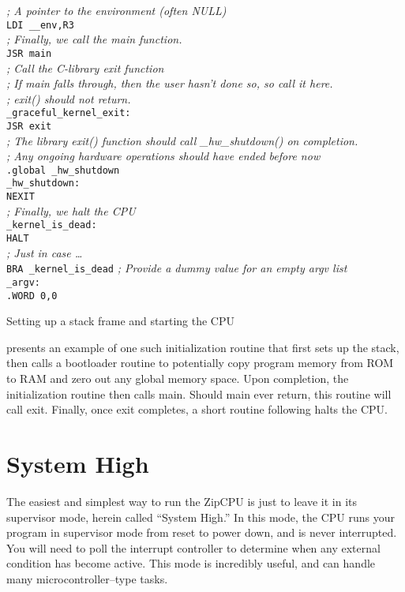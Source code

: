 \documentclass{gqtekspec}
\begin{document}
\begin{table}
\begin{center}
\begin{tabbing}
\>	{\em ; A pointer to the environment (often NULL)}\\
\>	{\tt LDI	\_\_env,R3} \\
%
%
\>	{\em ; Finally, we call the main function.}\\
\>	{\tt JSR	main}\\
%
%
{\em ; Call the C-library exit function}\\
{\em ; If main falls through, then the user hasn't done so, so call it here.}\\
{\em ; exit() should not return.}\\
{\tt \_graceful\_kernel\_exit:} \\
\>	{\tt JSR	exit}\\
%
{\em ; The library exit() function should call \_hw\_shutdown() on completion.}\\
{\em ; Any ongoing hardware operations should have ended before now}\\
\>	{\tt .global \_hw\_shutdown} \\
{\tt \_hw\_shutdown:} \\
\>	{\tt NEXIT}\\
%
%
{\em ; Finally, we halt the CPU }\\
{\tt \_kernel\_is\_dead:}\\
\>	{\tt HALT}\\
\>	{\em ; Just in case \ldots}\\
\> {\tt BRA \_kernel\_is\_dead}
{\em ; Provide a dummy value for an empty argv list}\\
{\tt \_argv:} \\
\> {\tt .WORD	0,0}
\end{tabbing}
\caption{Setting up a stack frame and starting the CPU}\label{tbl:op-init}
\end{center}\end{table}
presents an example of one such initialization routine
that first sets up the stack, then calls a bootloader routine to potentially
copy program memory from ROM to RAM and zero out any global memory space.
Upon completion, the initialization routine then calls main.  Should
main ever return, this routine will call exit.  Finally, once exit completes,
a short routine following halts the CPU.

\section{System High}
The easiest and simplest way to run the ZipCPU is just to leave it in its
supervisor mode, herein called ``System High.'' In this mode, the CPU runs
your program in supervisor mode from reset to power down, and is never
interrupted.  You will need to poll the interrupt controller to determine when
any external condition has become active.  This mode is incredibly useful, and
can handle many microcontroller--type tasks. 
\end{document}

